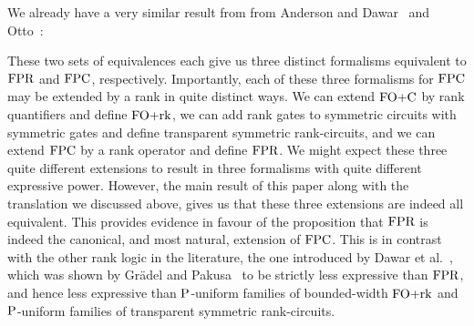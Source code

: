 \documentclass[../paper.tex]{subfiles}
\begin{document}

\begin{center}
\end{center}


We already have a very similar result from from Anderson and
Dawar~\cite{AndersonD17} and Otto~\cite{Otto1996}:

\begin{center}
\end{center}

These two sets of equivalences each give us three distinct formalisms equivalent
to $\text{\upshape FPR}$ and $\text{\upshape FPC}$, respectively. Importantly, each of these three formalisms
for $\text{\upshape FPC}$ may be extended by a rank in quite distinct ways. We can extend
$\text{\upshape FO+C}$ by rank quantifiers and define $\text{\upshape FO+rk}$, we can add rank gates to
symmetric circuits with symmetric gates and define transparent symmetric
rank-circuits, and we can extend $\text{\upshape FPC}$ by a rank operator and define $\text{\upshape FPR}$. We
might expect these three quite different extensions to result in three
formalisms with quite different expressive power. However, the main result of
this paper along with the translation we discussed above, gives us that these
three extensions are indeed all equivalent. This provides evidence in favour of
the proposition that $\text{\upshape FPR}$ is indeed the canonical, and most natural, extension
of $\text{\upshape FPC}$. This is in contrast with the other rank logic in the literature, the
one introduced by Dawar et al.~\cite{Dawar09logicswith}, which was shown by
Gr\"{a}del and Pakusa~\cite{GradelP15a} to be strictly less expressive than
$\text{\upshape FPR}$, and hence less expressive than $\mathrm{P}$-uniform families of bounded-width
$\text{\upshape FO+rk}$ and $\mathrm{P}$-uniform families of transparent symmetric rank-circuits.
\end{document}
